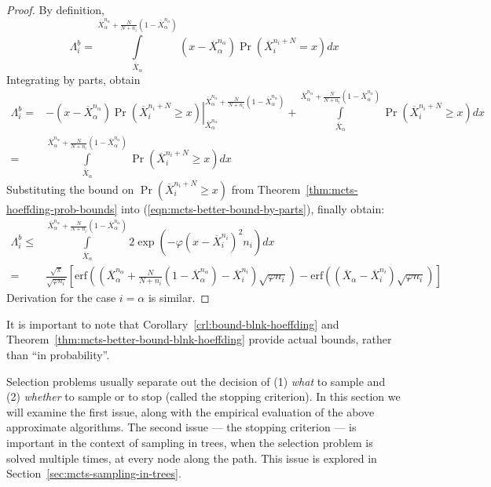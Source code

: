 \begin{proof}By definition,
\begin{equation}
\Lambda_i^b=\int\limits_{\overline X_\alpha}^{\overline X_\alpha^{n_\alpha}+\frac N {N+n_i}(1-\overline X_\alpha^{n_\alpha})}(x-\overline X_\alpha^{n_\alpha})\Pr\left(\overline X_i^{n_i+N}=x\right)dx
\label{eqn:mcts-lambda-blinkered-by-def}
\end{equation}
Integrating by parts, obtain
\begin{align}
\Lambda_i^b=&-\left.(x-\overline X_\alpha^{n_\alpha})\Pr\left(\overline X_i^{n_i+N}\ge x\right)\right|_{\overline X_\alpha^{n_\alpha}}^{\overline X_\alpha^{n_\alpha}+\frac N {N+n_i}(1-\overline X_\alpha^{n_\alpha})}+\int\limits_{\overline X_\alpha}^{\overline X_\alpha^{n_\alpha}+\frac N {N+n_i}(1-\overline X_\alpha^{n_\alpha})}\Pr\left(\overline X_i^{n_i+N}\ge x\right)dx\nonumber\\
=&\int\limits_{\overline X_\alpha}^{\overline X_\alpha^{n_\alpha}+\frac N {N+n_i}(1-\overline X_\alpha^{n_\alpha})}\Pr\left(\overline X_i^{n_i+N}\ge x\right)dx
\label{eqn:mcts-better-bound-by-parts}
\end{align}
Substituting the bound on $\Pr\left(\overline X_i^{n_i+N}\ge x\right)$ from Theorem~\ref{thm:mcts-hoeffding-prob-bounds} into (\ref{eqn:mcts-better-bound-by-parts}), finally obtain:
\begin{align}
\Lambda_i^b\le&\int\limits_{\overline X_\alpha}^{\overline X_\alpha^{n_\alpha}+\frac N {N+n_i}(1-\overline X_\alpha^{n_\alpha})}2\exp\left(-\varphi(x-\overline X_i^{n_i})^2n_i\right)dx\nonumber\\
 =&\frac {\sqrt \pi} {\sqrt {\varphi n_i}}
  \left[\mathrm{erf}\left(\left(\overline X_\alpha^{n_\alpha}+\frac N {N+n_i}(1-\overline X_\alpha^{n_\alpha})-\overline X_i^{n_i}\right)\sqrt {\varphi n_i}\right)-\mathrm{erf}\left((\overline X_\alpha - \overline X_i^{n_i})\sqrt{\varphi n_i}\right)\right]
\end{align}
Derivation for the case $i=\alpha$ is similar.
\end{proof}
\vspace{\baselineskip}
It is important to note that Corollary~\ref{crl:bound-blnk-hoeffding}
and Theorem~\ref{thm:mcts-better-bound-blnk-hoeffding}
provide actual bounds, rather than ``in probability''.

Selection problems usually separate out the decision of (1) {\em what}
to sample and (2) {\em whether} to sample or to stop (called the stopping criterion).
In this section we will examine the first issue, along with the empirical evaluation 
of the above approximate algorithms. The second issue --- the stopping
criterion --- is important in the context of sampling in trees, when the
selection problem is solved multiple times, at every node along the
path. This issue is explored in Section~\ref{sec:mcts-sampling-in-trees}.

